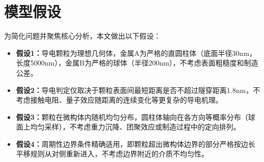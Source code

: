 
\section{模型假设}

为简化问题并聚焦核心分析，本文做出以下假设：

\begin{itemize}[itemindent=2em]
\item \textbf{假设1：}导电颗粒为理想几何体，金属A为严格的直圆柱体（底面半径30nm，长度5000nm），金属B为严格的球体（半径200nm），不考虑表面粗糙度和制造公差。
\item \textbf{假设2：}导电判定仅取决于颗粒表面间最短距离是否不超过隧穿距离1.8nm，不考虑接触电阻、量子效应随距离的连续变化等更复杂的导电机理。
\item \textbf{假设3：}颗粒在微构体内随机均匀分布，圆柱体轴向在各方向等概率分布（球面上均匀采样），不考虑重力沉降、团聚效应或制造过程中的定向排列。
\item \textbf{假设4：}周期性边界条件精确适用，即颗粒超出微构体边界的部分严格按边长平移规则从对侧重新进入，不考虑边界附近的介质不均匀性。
\end{itemize}
